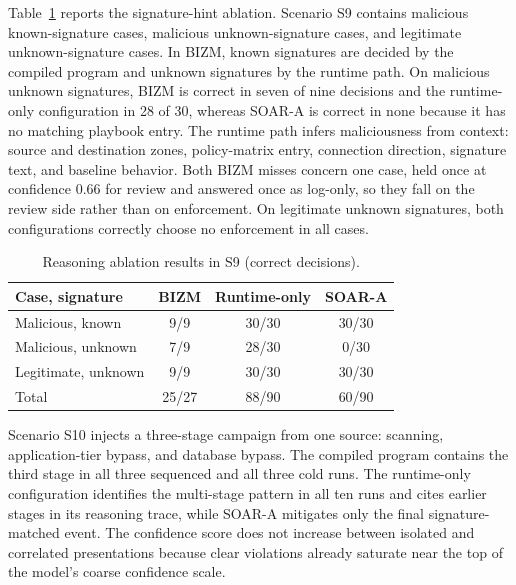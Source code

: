 \documentclass[final,5p]{elsarticle}
\begin{document}
Table~\ref{tab:reasoning} reports the signature-hint ablation. Scenario S9 contains malicious known-signature cases, malicious unknown-signature cases, and legitimate unknown-signature cases. In BIZM, known signatures are decided by the compiled program and unknown signatures by the runtime path. On malicious unknown signatures, BIZM is correct in seven of nine decisions and the runtime-only configuration in 28 of 30, whereas SOAR-A is correct in none because it has no matching playbook entry. The runtime path infers maliciousness from context: source and destination zones, policy-matrix entry, connection direction, signature text, and baseline behavior. Both BIZM misses concern one case, held once at confidence 0.66 for review and answered once as log-only, so they fall on the review side rather than on enforcement. On legitimate unknown signatures, both configurations correctly choose no enforcement in all cases.

\begin{table}[tbp]
    \centering
    \caption{Reasoning ablation results in S9 (correct decisions).}
    \label{tab:reasoning}
    \small
    \setlength{\tabcolsep}{3.5pt}
    \begin{tabular}{@{}lccc@{}}
        \toprule
        \textbf{Case, signature} & \textbf{BIZM} & \textbf{Runtime-only} & \textbf{SOAR-A} \\
        \midrule
        Malicious, known    & 9/9   & 30/30 & 30/30 \\
        Malicious, unknown  & 7/9   & 28/30 & 0/30  \\
        Legitimate, unknown & 9/9   & 30/30 & 30/30 \\
        \midrule
        Total                         & 25/27 & 88/90 & 60/90 \\
        \bottomrule
    \end{tabular}
\end{table}

Scenario S10 injects a three-stage campaign from one source: scanning, application-tier bypass, and database bypass. The compiled program contains the third stage in all three sequenced and all three cold runs. The runtime-only configuration identifies the multi-stage pattern in all ten runs and cites earlier stages in its reasoning trace, while SOAR-A mitigates only the final signature-matched event. The confidence score does not increase between isolated and correlated presentations because clear violations already saturate near the top of the model's coarse confidence scale.
\end{document}

